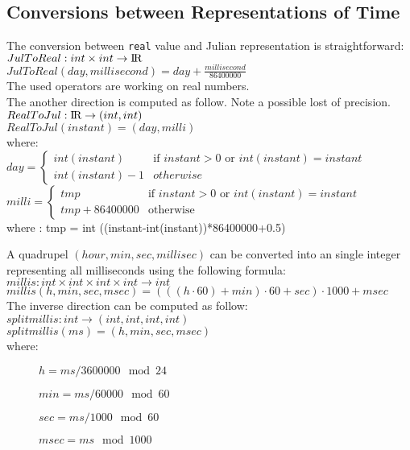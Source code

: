 \documentclass[english,a4paper]{article}
\newcommand{\R}{\ensuremath{\mbox{I\hspace*{-0.1em}R}}}
\begin{document}
\subsection{Conversions between Representations of Time}
\label{TimeConversions}
The conversion between {\tt real} value and Julian representation
is straightforward:\\
$ JulToReal : int \times int \rightarrow \R$ \\
$ JulToReal(day,millisecond) = day + \frac{millisecond}{86400000}$ \\
The used operators are working on real numbers.\\[1em]
The another direction is computed as follow. Note a possible lost of 
precision.\\
$ RealToJul : \R \rightarrow (int,int)$ \\
$ RealToJul(instant) = (day,milli) $ \\
where:\\
{\small
$ day = \left\{ \begin{array}{ll}
                    int(instant) & \mbox{if } instant > 0 
                                   \mbox{ or } int(instant)=instant\\
                    int(instant)-1 & otherwise
                \end{array} \right. $\\[1em]
$ milli = \left\{ \begin{array}{ll}
                         tmp & \mbox{if } instant > 0 \mbox{ or } int(instant)=instant\\
                         tmp + 86400000 & \mbox{otherwise}
                      \end{array}\right. $ \\[1em]
\hspace*{1cm}where : tmp = int ((instant-int(instant))*86400000+0.5)}\vspace{1cm}
              

A quadrupel $(hour, min , sec, millisec)$ can be converted into
an single integer representing all milliseconds using the following formula:\\
$ millis : int \times int \times int \times int \rightarrow int $\\
$ millis(h,min,sec,msec) = (((h\cdot 60) + min)\cdot 60 + sec)\cdot 1000+ msec $
\\[1em]
The inverse direction can be computed as follow:\\
$ splitmillis: int \rightarrow (int,int,int,int)$ \\
$ splitmillis(ms) = (h,min,sec,msec)$ \\
where:
\begin{description}
   \item[] $ h =   {ms}/{3600000} \mod 24 $
   \item[] $ min = {ms}/{60000} \mod 60$
   \item[] $ sec = {ms}/{1000} \mod 60$
   \item[] $ msec = ms \mod 1000 $
\end{description}
\end{document}
